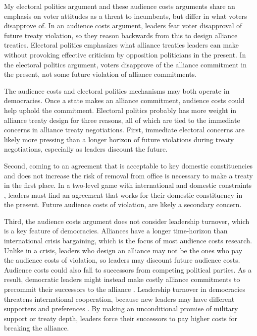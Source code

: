 \documentclass[12pt]{article}
\begin{document}
My electoral politics argument and these audience costs arguments share an emphasis on voter attitudes as a threat to incumbents, but differ in what voters disapprove of. 
In an audience costs argument, leaders fear voter disapproval of future treaty violation, so they reason backwards from this to design alliance treaties. 
Electoral politics emphasizes what alliance treaties leaders can make without provoking effective criticism by opposition politicians in the present. 
In the electoral politics argument, voters disapprove of the alliance commitment in the present, not some future violation of alliance commitments. 
    

The audience costs and electoral politics mechanisms may both operate in democracies. 
Once a state makes an alliance commitment, audience costs could help uphold the commitment. 
Electoral politics probably has more weight in alliance treaty design for three reasons, all of which are tied to the immediate concerns in alliance treaty negotiations. 
First, immediate electoral concerns are likely more pressing than a longer horizon of future violations during treaty negotiations, especially as leaders discount the future.  


Second, coming to an agreement that is acceptable to key domestic constituencies and does not increase the risk of removal from office is necessary to make a treaty in the first place. 
In a two-level game with international and domestic constraints \citep{Putnam1988}, leaders must find an agreement that works for their domestic constituency in the present. 
Future audience costs of violation, are likely a secondary concern.  


Third, the audience costs argument does not consider leadership turnover, which is a key feature of democracies. 
Alliances have a longer time-horizon than international crisis bargaining, which is the focus of most audience costs research. 
Unlike in a crisis, leaders who design an alliance may not be the ones who pay the audience costs of violation, so leaders may discount future audience costs. 
Audience costs could also fall to successors from competing political parties. 
As a result, democratic leaders might instead make costly alliance commitments to precommit their successors to the alliance \citep{Mattes2012a}. 
Leadership turnover in democracies threatens international cooperation, because new leaders may have different supporters and preferences \citep{Lobell2004, Narizny2007, Leedsetal2009}. 
By making an unconditional promise of military support or treaty depth, leaders force their successors to pay higher costs for breaking the alliance. 
\end{document}
